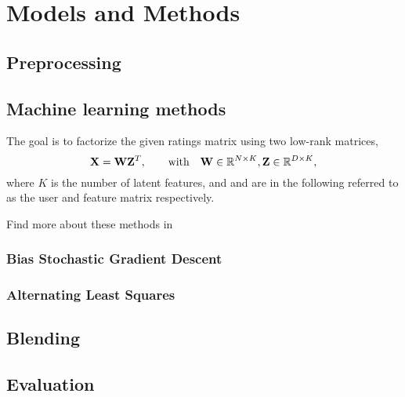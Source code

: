 \section{Models and Methods}

\subsection{Preprocessing}



\subsection{Machine learning methods}
\label{sec:methods}

The goal is to factorize the given ratings matrix using two low-rank matrices, 
\begin{equation}
  \mathbf{X} = \mathbf{W}\mathbf{Z}^T ,\hspace{2em} \text{with} \hspace{1em} \mathbf{W} \in\mathbb{R}^{N \times K},
  \mathbf{Z} \in\mathbb{R}^{D \times K}, 
\end{equation}
where $K$ is the number of latent features, and  and  are in the following
referred to as the user and feature matrix respectively.

Find more about these methods in \cite{Aberger2009}

\subsubsection{Bias Stochastic Gradient Descent}



\subsubsection{Alternating Least Squares}



\subsection{Blending}



\subsection{Evaluation}

